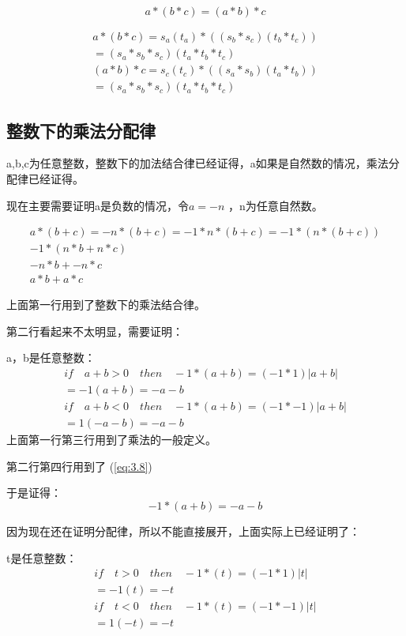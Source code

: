 \documentclass[12pt,oneside]{book}
\begin{document}
\begin{equation}
a * (b * c) = (a * b) * c
\end{equation}

\begin{align}
a * (b * c) = s_a(t_a) * ((s_b*s_c)(t_b*t_c))\\
= (s_a*s_b*s_c)(t_a*t_b*t_c)\\
(a * b) * c = s_c(t_c) * ((s_a*s_b)(t_a*t_b))\\
= (s_a*s_b*s_c)(t_a*t_b*t_c)
\end{align}


\subsection{整数下的乘法分配律}
a,b,c为任意整数，整数下的加法结合律已经证得，a如果是自然数的情况，乘法分配律已经证得。

现在主要需要证明a是负数的情况，令$a=-n$ ，n为任意自然数。

\begin{align*}
a*(b+c) = -n*(b+c) = -1*n*(b+c) = -1*(n * (b+c))\\
-1 * (n*b+n*c)\\
-n*b + -n*c\\
a*b + a*c
\end{align*}

上面第一行用到了整数下的乘法结合律。

第二行看起来不太明显，需要证明：

a，b是任意整数：
\begin{align*}
if \quad a+b > 0 \quad then \quad -1 * (a+b) = (-1*1)|a+b|\\
= -1(a+b) = -a - b \\
if \quad a+b <0  \quad then \quad -1 * (a+b) = (-1*-1)|a+b|\\ 
= 1(-a-b) = -a-b
\end{align*}
上面第一行第三行用到了乘法的一般定义。

第二行第四行用到了 (\ref{eq:3.8})

于是证得：
\begin{equation}
\label{eq:4.10}
-1 * (a+b) = -a -b
\end{equation}

因为现在还在证明分配律，所以不能直接展开，上面实际上已经证明了：

t是任意整数：
\begin{align*}
if \quad t > 0 \quad then \quad -1 * (t) = (-1*1)|t|\\
= -1(t) = -t \\
if \quad t <0  \quad then \quad -1 * (t) = (-1*-1)|t|\\ 
= 1(-t) = -t
\end{align*}
\end{document}
